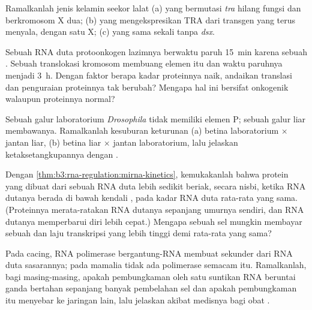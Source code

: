 \begin{exercise}[$\star\star$]\label{exo:b3:rna-regulation:7}
Ramalkanlah jenis kelamin seekor lalat (a) yang bermutasi \emph{tra} hilang
fungsi dan berkromosom X dua; (b) yang mengekspresikan TRA dari transgen yang
terus menyala, dengan satu X; (c) yang sama sekali tanpa \emph{dsx}.
\end{exercise}

\begin{exercise}[$\star\star$]\label{exo:b3:rna-regulation:8}
Sebuah RNA duta protoonkogen lazimnya berwaktu paruh \qty{15}{min}
karena sebuah . Sebuah translokasi kromosom membuang elemen itu
dan waktu paruhnya menjadi \qty{3}{h}. Dengan faktor berapa kadar proteinnya
naik, andaikan translasi dan penguraian proteinnya tak berubah? Mengapa hal
ini bersifat onkogenik walaupun proteinnya normal?
\end{exercise}

\begin{exercise}[$\star\star$]\label{exo:b3:rna-regulation:9}
Sebuah galur laboratorium \emph{Drosophila} tidak memiliki elemen P; sebuah
galur liar membawanya. Ramalkanlah kesuburan keturunan
(a) betina laboratorium $\times$ jantan liar, (b) betina liar $\times$
jantan laboratorium, lalu jelaskan ketaksetangkupannya dengan .
\end{exercise}

\begin{exercise}[$\star\star\star$]\label{exo:b3:rna-regulation:10}
Dengan \cref{thm:b3:rna-regulation:mirna-kinetics}, kemukakanlah bahwa protein
yang dibuat dari sebuah RNA duta lebih sedikit beriak, secara nisbi, ketika
RNA dutanya berada di bawah kendali , pada kadar RNA duta rata-rata
yang sama. (Proteinnya merata-ratakan RNA dutanya sepanjang umurnya sendiri,
dan RNA dutanya memperbarui diri lebih cepat.) Mengapa sebuah sel mungkin
membayar sebuah  dan laju transkripsi yang lebih tinggi demi rata-rata
yang sama?
\end{exercise}

\begin{exercise}[$\star\star\star$]\label{exo:b3:rna-regulation:11}
Pada cacing, RNA polimerase bergantung-RNA membuat  sekunder dari
RNA duta sasarannya; pada mamalia tidak ada polimerase semacam itu.
Ramalkanlah, bagi masing-masing, apakah pembungkaman oleh satu suntikan RNA
beruntai ganda bertahan sepanjang banyak pembelahan sel dan apakah
pembungkaman itu menyebar ke jaringan lain, lalu jelaskan akibat medisnya bagi
obat .
\end{exercise}


